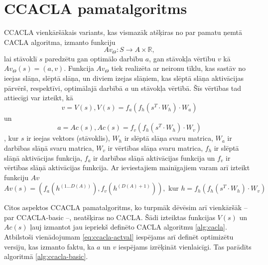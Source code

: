 \documentclass{ludis} %
\begin{document}
\section{CCACLA pamatalgoritms}
CCACLA vienkāršākais variants, kas vismazāk atšķiras no par pamatu ņemtā CACLA
algoritma, izmanto funkciju 
\begin{equation}
  Av_\Theta:S \rightarrow A \times \mathbb{R},
\end{equation}
lai stāvoklī $s$ paredzētu gan optimālo darbību $a$, gan stāvokļa vērtību $v$ kā
$Av_\Theta(s) = (a, v)$. Funkcija $Av_\Theta$ tiek realizēta ar
neironu tīklu, kas sastāv no ieejas slāņa, slēptā slāņa, un diviem izejas
slāņiem, kas slēptā slāņa aktivācijas pārvērš, respektīvi, optimālajā darbībā
$a$ un stāvokļa vērtībā. Šīs vērtības tad attiecīgi var izteikt, kā
\begin{equation}\label{eq:ccacla-act}
  v = V(s), V(s) = f_a\left(f_h(s^T \cdot W_h) \cdot W_a\right)
\end{equation} un
\begin{equation}\label{eq:ccacla-val}
  a = Ac(s), Ac(s) = f_v\left(f_h(s^T \cdot W_h) \cdot W_v\right)
\end{equation}, kur $s$ ir
ieejas vektors (stāvoklis), $W_h$ ir slēptā slāņa svaru matrica, $W_a$ ir
darbības slāņā svaru matrica, $W_v$ ir vērtības slāņa svaru matrica, $f_h$ ir
slēptā slāņā aktivācijas funkcija, $f_a$ ir darbības slāņā aktivācijas funkcija
un $f_v$ ir vērtības slāņā aktivācijas funkcija. Ar ieviestajiem mainīgajiem
varam arī izteikt funkciju $Av$
\begin{equation}\label{eq:ccacla-actval}
  Av(s) = \left(f_a(h^{(1 \ldots D(A))}), f_v(h^{(D(A) + 1)})\right), \text{ kur } 
  h = f_h\left(f_h(s^T \cdot W_h) \cdot W_v\right)
\end{equation}

Citos aspektos CCACLA pamatalgoritms, ko turpmāk dēvēsim arī vienkāršāk -- par
CCACLA-basic --, neatšķiras no CACLA. Šādi izteiktas funkcijas
$V(s)$ un $Ac(s)$ ļauj izmantot jau iepriekš definēto CACLA algoritmu
\ref{alg:cacla}. Atbilstoši vienādojumam \ref{eq:ccacla-actval} iespējams
arī definēt optimizētu versiju, kas izmanto faktu, ka $a$ un $v$ iespējams
izrēķināt vienlaicīgi. Tas parādīts algoritmā \ref{alg:ccacla-basic}.
\end{document}

